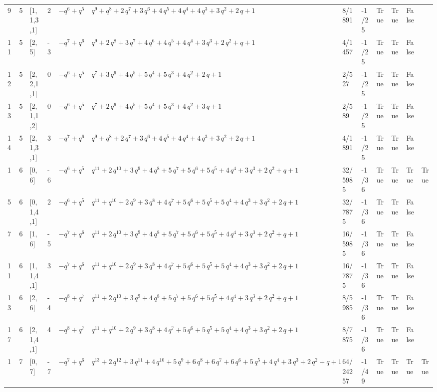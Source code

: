 \documentclass[10pt]{article}
\begin{document}
{\begin{longtable}{@{}llllllllllll@{}}
9 & 5 & [1,1,3,1] & 2 & $-q^{6} + q^{5}$ & $q^{9} + q^{8} + 2\,q^{7} + 3\,q^{6} + 4\,q^{5} + 4\,q^{4} + 4\,q^{3} + 3\,q^{2} + 2\,q + 1$ & 8/1891 & -1/25 & True & True & False &  \\
11 & 5 & [2,5] & -3 & $-q^{7} + q^{6}$ & $q^{9} + 2\,q^{8} + 3\,q^{7} + 4\,q^{6} + 4\,q^{5} + 4\,q^{4} + 3\,q^{3} + 2\,q^{2} + q + 1$ & 4/1457 & -1/25 & True & True & False &  \\
12 & 5 & [2,2,1,1] & 0 & $-q^{6} + q^{5}$ & $q^{7} + 3\,q^{6} + 4\,q^{5} + 5\,q^{4} + 5\,q^{3} + 4\,q^{2} + 2\,q + 1$ & 2/527 & -1/25 & True & True & False &  \\
13 & 5 & [2,1,1,2] & 0 & $-q^{6} + q^{5}$ & $q^{7} + 2\,q^{6} + 4\,q^{5} + 5\,q^{4} + 5\,q^{3} + 4\,q^{2} + 3\,q + 1$ & 2/589 & -1/25 & True & True & False &  \\
14 & 5 & [2,1,3,1] & 3 & $-q^{7} + q^{6}$ & $q^{9} + q^{8} + 2\,q^{7} + 3\,q^{6} + 4\,q^{5} + 4\,q^{4} + 4\,q^{3} + 3\,q^{2} + 2\,q + 1$ & 4/1891 & -1/25 & True & True & False &  \\
1 & 6 & [0,6] & -6 & $-q^{6} + q^{5}$ & $q^{11} + 2\,q^{10} + 3\,q^{9} + 4\,q^{8} + 5\,q^{7} + 5\,q^{6} + 5\,q^{5} + 4\,q^{4} + 3\,q^{3} + 2\,q^{2} + q + 1$ & 32/5985 & -1/36 & True & True & True & True \\
5 & 6 & [0,1,4,1] & 2 & $-q^{6} + q^{5}$ & $q^{11} + q^{10} + 2\,q^{9} + 3\,q^{8} + 4\,q^{7} + 5\,q^{6} + 5\,q^{5} + 5\,q^{4} + 4\,q^{3} + 3\,q^{2} + 2\,q + 1$ & 32/7875 & -1/36 & True & True & False &  \\
7 & 6 & [1,6] & -5 & $-q^{7} + q^{6}$ & $q^{11} + 2\,q^{10} + 3\,q^{9} + 4\,q^{8} + 5\,q^{7} + 5\,q^{6} + 5\,q^{5} + 4\,q^{4} + 3\,q^{3} + 2\,q^{2} + q + 1$ & 16/5985 & -1/36 & True & True & False &  \\
11 & 6 & [1,1,4,1] & 3 & $-q^{7} + q^{6}$ & $q^{11} + q^{10} + 2\,q^{9} + 3\,q^{8} + 4\,q^{7} + 5\,q^{6} + 5\,q^{5} + 5\,q^{4} + 4\,q^{3} + 3\,q^{2} + 2\,q + 1$ & 16/7875 & -1/36 & True & True & False &  \\
13 & 6 & [2,6] & -4 & $-q^{8} + q^{7}$ & $q^{11} + 2\,q^{10} + 3\,q^{9} + 4\,q^{8} + 5\,q^{7} + 5\,q^{6} + 5\,q^{5} + 4\,q^{4} + 3\,q^{3} + 2\,q^{2} + q + 1$ & 8/5985 & -1/36 & True & True & False &  \\
17 & 6 & [2,1,4,1] & 4 & $-q^{8} + q^{7}$ & $q^{11} + q^{10} + 2\,q^{9} + 3\,q^{8} + 4\,q^{7} + 5\,q^{6} + 5\,q^{5} + 5\,q^{4} + 4\,q^{3} + 3\,q^{2} + 2\,q + 1$ & 8/7875 & -1/36 & True & True & False &  \\
1 & 7 & [0,7] & -7 & $-q^{7} + q^{6}$ & $q^{13} + 2\,q^{12} + 3\,q^{11} + 4\,q^{10} + 5\,q^{9} + 6\,q^{8} + 6\,q^{7} + 6\,q^{6} + 5\,q^{5} + 4\,q^{4} + 3\,q^{3} + 2\,q^{2} + q + 1$ & 64/24257 & -1/49 & True & True & True & True \\

\end{longtable}}
\end{document}
